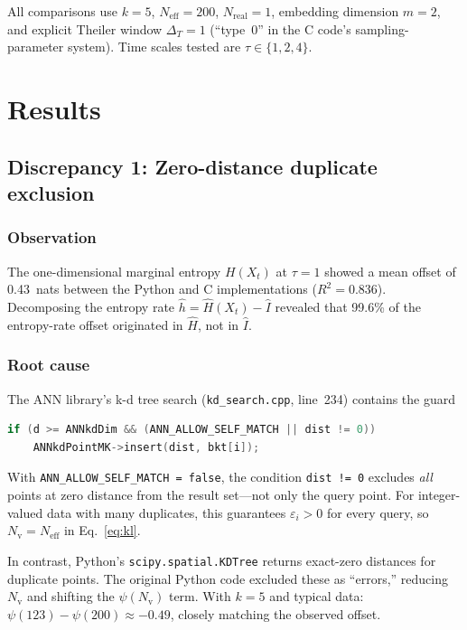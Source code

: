 \documentclass[12pt,a4paper]{article}
\newcommand{\Neff}{N_{\mathrm{eff}}}
\begin{document}
All comparisons use $k = 5$, $\Neff = 200$, $N_{\mathrm{real}} = 1$, embedding dimension $m = 2$, and explicit Theiler window $\Delta_T = 1$ (``type~0'' in the C code's sampling-parameter system).
Time scales tested are $\tau \in \{1, 2, 4\}$.


\section{Results}\label{sec:results}

\subsection{Discrepancy 1: Zero-distance duplicate exclusion}\label{sec:bug1}

\subsubsection{Observation}
The one-dimensional marginal entropy $H(X_t)$ at $\tau = 1$ showed a mean offset of \SI{0.43}{nats} between the Python and C implementations ($R^2 = 0.836$).
Decomposing the entropy rate $\hat{h} = \hat{H}(X_t) - \hat{I}$ revealed that 99.6\% of the entropy-rate offset originated in $\hat{H}$, not in $\hat{I}$.

\subsubsection{Root cause}
The ANN library's k-d tree search (\texttt{kd\_search.cpp}, line~234) contains the guard
\begin{lstlisting}[language=C,numbers=none]
if (d >= ANNkdDim && (ANN_ALLOW_SELF_MATCH || dist != 0))
    ANNkdPointMK->insert(dist, bkt[i]);
\end{lstlisting}
With \texttt{ANN\_ALLOW\_SELF\_MATCH = false}, the condition \texttt{dist != 0} excludes \emph{all} points at zero distance from the result set---not only the query point.
For integer-valued data with many duplicates, this guarantees $\varepsilon_i > 0$ for every query, so $N_{\mathrm{v}} = \Neff$ in Eq.~\eqref{eq:kl}.

In contrast, Python's \texttt{scipy.spatial.KDTree} returns exact-zero distances for duplicate points.
The original Python code excluded these as ``errors,'' reducing $N_{\mathrm{v}}$ and shifting the $\psi(N_{\mathrm{v}})$ term.
With $k = 5$ and typical data: $\psi(123) - \psi(200) \approx -0.49$, closely matching the observed offset.
\end{document}
